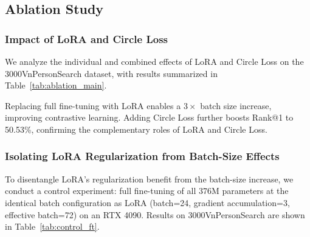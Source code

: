 \documentclass{article}
\begin{document}
\subsection{Ablation Study}

\subsubsection{Impact of LoRA and Circle Loss}
We analyze the individual and combined effects of LoRA and Circle Loss on the 3000VnPersonSearch dataset, with results summarized in Table~\ref{tab:ablation_main}.

\begin{table}[H]
    \centering
    \vspace{-0.5em}
    \caption{Ablation study on the impact of LoRA and Circle Loss on the 3000VnPersonSearch dataset. Best results are in \textbf{bold}.}
    \label{tab:ablation_main}
\end{table}

Replacing full fine-tuning with LoRA enables a $3\times$ batch size increase, improving contrastive learning. Adding Circle Loss further boosts Rank@1 to 50.53\%, confirming the complementary roles of LoRA and Circle Loss.

\subsubsection{Isolating LoRA Regularization from Batch-Size Effects}
To disentangle LoRA's regularization benefit from the batch-size increase, we conduct a control experiment: full fine-tuning of all 376M parameters at the identical batch configuration as LoRA (batch=24, gradient accumulation=3, effective batch=72) on an RTX 4090. Results on 3000VnPersonSearch are shown in Table~\ref{tab:control_ft}.
\end{document}
